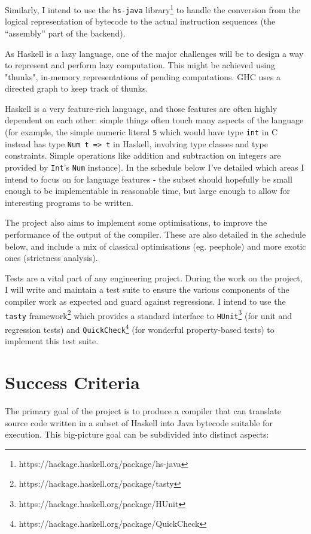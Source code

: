 \documentclass[12pt]{article}
\newcommand\haskell[1]{\texttt{#1}}
\newcommand\monospace[1]{\texttt{#1}}
\begin{document}
Similarly, I intend to use the \monospace{hs-java} library\footnote{https://hackage.haskell.org/package/hs-java} to
handle the conversion from the logical representation of bytecode to the actual instruction sequences (the ``assembly''
part of the backend).

As Haskell is a lazy language, one of the major challenges will be to design a way to represent and perform lazy
computation. This might be achieved using "thunks", in-memory representations of pending computations. GHC uses a
directed graph to keep track of thunks.

Haskell is a very feature-rich language, and those features are often highly dependent on each other: simple things
often touch many aspects of the language (for example, the simple numeric literal \haskell{5} which would have type
\texttt{int} in C instead has type \haskell{Num t => t} in Haskell, involving type classes and type constraints.
Simple operations like addition and subtraction on integers are provided by \haskell{Int}'s \haskell{Num} instance). In
the schedule below I've detailed which areas I intend to focus on for language features - the subset should hopefully be
small enough to be implementable in reasonable time, but large enough to allow for interesting programs to be written.

The project also aims to implement some optimisations, to improve the performance of the output of the compiler. These
are also detailed in the schedule below, and include a mix of classical optimisations (eg. peephole) and more exotic
ones (strictness analysis).

Tests are a vital part of any engineering project. During the work on the project, I will write and maintain a test suite
to ensure the various components of the compiler work as expected and guard against regressions. I intend to use the
\monospace{tasty} framework\footnote{https://hackage.haskell.org/package/tasty} which provides a standard interface to
\monospace{HUnit}\footnote{https://hackage.haskell.org/package/HUnit} (for unit and regression tests) and
\monospace{QuickCheck}\footnote{https://hackage.haskell.org/package/QuickCheck} (for wonderful property-based tests) to
implement this test suite.


\section*{Success Criteria}

The primary goal of the project is to produce a compiler that can translate source code written in a subset of Haskell
into Java bytecode suitable for execution. This big-picture goal can be subdivided into distinct aspects:
\end{document}
